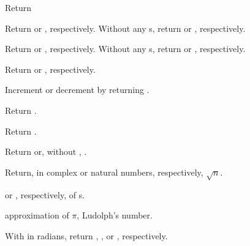 \begin{LIST}{1cm}

  {
  Return 
  }

  {
  Return  or , respectively. Without any
  s, return  or , respectively.
  }

  {
  Return  or , respectively. Without any
  s, return  or , respectively.
  }

  {Return  or
  , respectively.
  }

  {
  Increment or
  decrement  by  returning .
  }

  {Return .
    }

  {Return .
    }

  {
  Return  or,
  without , .
  }

  {
  Return, in complex or natural numbers, respectively, $\sqrt{n}$.
  }

  {
   or , respectively, of s. 
  }

  {
   approximation of $\pi$, Ludolph's number.
  }

  {
  With  in radians, return , , or , respectively.
  }


\end{LIST}

